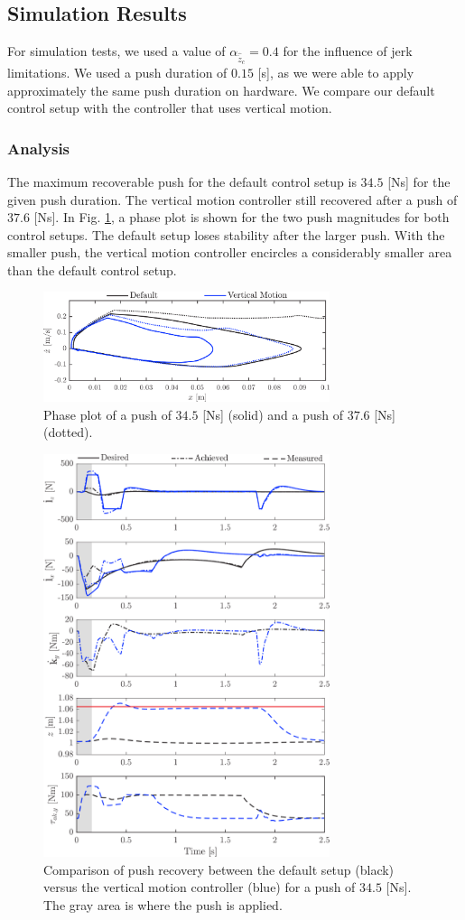 \documentclass[letterpaper, 10 pt, conference]{ieeeconf}  %
\begin{document}
\subsection{Simulation Results}
For simulation tests, we used a value of $\alpha_{\hat{\ddot{z}}_{c}}=0.4$ for the influence of jerk limitations. We used a push duration of $0.15$ [s], as we were able to apply approximately the same push duration on hardware. We compare our default control setup with the controller that uses vertical motion. 

\subsubsection{Analysis}
The maximum recoverable push for the default control setup is $34.5$ [Ns] for the given push duration. The vertical motion controller still recovered after a push of $37.6$ [Ns]. In Fig. \ref{fig:valcomparephase}, a phase plot is shown for the two push magnitudes for both control setups. The default setup loses stability after the larger push. With the smaller push, the vertical motion controller encircles a considerably smaller area than the default control setup.
\begin{figure}
      \centering
      \includegraphics[width=3.3in]{valcomparephase.png}
      \caption{Phase plot of a push of $34.5$ [Ns] (solid) and a push of $37.6$ [Ns] (dotted).}
      \label{fig:valcomparephase}
\end{figure}
\begin{figure}[h]
      \centering
      \includegraphics[width=3.3in]{valcomparetime.png}
      \caption{Comparison of push recovery between the default setup (black) versus the vertical motion controller (blue) for a push of $34.5$ [Ns]. The gray area is where the push is applied. }
      \label{fig:valcompare}
\end{figure}
\end{document}
